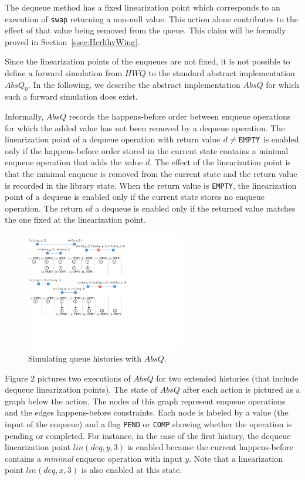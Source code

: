 The dequeue method has a fixed linearization point which corresponds to an execution of {\tt swap} returning a non-null value. This action alone contributes to the effect of that value being removed from the queue. This claim will be formally proved in Section~\ref{ssec:HerlihyWing}.

Since the linearization points of the enqueues are not fixed, it is not possible to define a forward simulation from $\mathit{HWQ}$ to the standard abstract implementation $AbsQ_0$. In the following, we describe the abstract implementation $AbsQ$ for which such a forward simulation does exist.

Informally, $AbsQ$ records the happens-before order between enqueue operations for which the added value has not been removed by a dequeue operation. The linearization point of a dequeue operation with return value $d\neq{\tt EMPTY}$ is enabled only if the happens-before order stored in the current state contains a minimal enqueue operation that adds the value $d$. The effect of the linearization point is that the minimal enqueue is removed from the current state and the return value is recorded in the library state. When the return value is {\tt EMPTY}, the linearization point of a dequeue is enabled only if the current state stores no enqueue operation. The return of a dequeue is enabled only if the returned value matches the one fixed at the linearization point.

\begin{figure}
\vspace{-8mm}
\includegraphics[width=7cm]{fig-queue12.pdf}
%
\vspace{-5mm}
\caption{Simulating queue histories with $AbsQ$.}
\label{fig:queueSim}
\vspace{-10mm}
\end{figure}
Figure 2 pictures two executions of $AbsQ$ for two extended histories (that include dequeue linearization points). The state of $AbsQ$ after each action is pictured as a graph below the action. The nodes of this graph represent enqueue operations and the edges happens-before constraints. Each node is labeled by a value (the input of the enqueue) and a flag {\tt PEND} or {\tt COMP} showing whether the operation is pending or completed. For instance, in the case of the first history, the dequeue linearization point $lin(deq,y,3)$ is enabled because the current happens-before contains a \emph{minimal} enqueue operation with input $y$. Note that a linearization point $lin(deq,x,3)$ is also enabled at this state.

